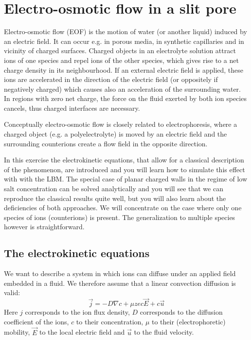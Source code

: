 \chapter{Electro-osmotic flow in a slit pore}
Electro-osmotic flow (EOF) is the motion of water (or another liquid)
induced by an electric field. It can occur e.g. in porous media,
in synthetic capillaries and in vicinity of charged surfaces.
Charged objects in an electrolyte solution attract ions of one
species and repel ions of the other species, which gives rise
to a net charge density in its neighbourhood. If an external
electric field is applied, these ions are accelerated in the direction
of the electric field (or oppositely if negatively charged) which
causes also an acceleration of the surrounding water. In regions
with zero net charge, the force on the fluid exerted by both ion
species cancels, thus charged interfaces are necessary.

Conceptually electro-osmotic flow is closely related to electrophoresis,
where a charged object (e.g. a polyelectrolyte) is moved by an
electric field and the surrounding counterions create a flow field
in the opposite direction. 

In this exercise the electrokinetic equations, that allow for a classical
description of the phenomenon, are introduced and you will learn
how to simulate this effect with \ES{} with the LBM. The special case of
planar charged walls in the regime of low salt concentration can
be solved analytically and you will see that we can reproduce the
classical results quite well, but you will also learn about the
deficiencies of both approaches. We will concentrate on the case
where only one species of ions (counterions) is present. The generalization
to multiple species however is straightforward.

\section{The electrokinetic equations}
We want to describe a system in which ions can diffuse under an
applied field embedded in a fluid. We therefore assume that a 
linear convection diffusion is valid:
\begin{equation}
  \vec{j}=-D \nabla c + \mu ze c \vec{E} + c \vec{u}
\end{equation}
Here $j$ corresponds to the ion flux density, $D$ corresponds 
to the diffusion coefficient of the ions,
$c$ to their concentration, $\mu$ to their (electrophoretic)
mobility, $\vec{E}$ to the local electric field and $\vec{u}$
to the fluid velocity.

